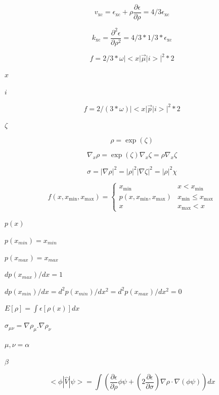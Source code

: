 \documentclass{article}
\begin{document}
\[
   v_\mathrm{xc} = \epsilon_\mathrm{xc} + \rho\frac{\partial \epsilon}{\partial \rho}
                 = 4/3\epsilon_\mathrm{xc}
\]
\pagebreak

\[
   k_\mathrm{xc} = \frac{\partial^2\epsilon}{\partial \rho^2} = 4/3*1/3 * \epsilon_\mathrm{xc}
\]
\pagebreak

\[
f = 2/3 * \omega |<x | \vec \mu | i >| ^2 * 2
\]
\pagebreak

$ x $
\pagebreak

$ i $
\pagebreak

\[
f = 2/(3 * \omega) |<x | \vec p | i >| ^2 * 2
\]
\pagebreak

$ \zeta $
\pagebreak

\[
\rho = \exp(\zeta)
\]
\pagebreak

\[
\nabla_x\rho = \exp(\zeta)\nabla_x\zeta = \rho \nabla_x\zeta
\]
\pagebreak

\[
  \sigma = |\nabla\rho|^2 = |\rho|^2 |\nabla\zeta|^2 = |\rho|^2 \chi
\]
\pagebreak

\[
f(x,x_{\mathrm{min}},x_{\mathrm{max}}) = \left\{
  \begin{array}{ll}
    x_{\mathrm{min}}                       & x < x_{\mathrm{min}} \\
    p(x,x_{\mathrm{min}},x_{\mathrm{max}}) & x_{\mathrm{min}} \leq x_{\mathrm{max}} \\
    x                                      & x_{\mathrm{max}} < x
  \end{array}
\right.
\]
\pagebreak

$p(x)$
\pagebreak

$p(x_{min})=x_{min}$
\pagebreak

$p(x_{max})=x_{max}$
\pagebreak

$dp(x_{max})/dx=1$
\pagebreak

$dp(x_{min})/dx=d^2p(x_{min})/dx^2=d^2p(x_{max})/dx^2=0$
\pagebreak

$ E[\rho] = \int \epsilon[\rho(x)] dx$
\pagebreak

$ \sigma_{\mu \nu} = \nabla \rho_{\mu} . \nabla \rho_{\nu} $
\pagebreak

$ \mu, \nu = \alpha$
\pagebreak

$ \beta $
\pagebreak

\[
  < \phi | \hat V | \psi > = \int \left( \frac{\partial \epsilon}{\partial \rho} \phi \psi
                 +  \left( 2 \frac{\partial \epsilon}{\partial \sigma} \right)
                 \nabla \rho \cdot \nabla \left( \phi \psi \right) \right) dx
\]
\pagebreak
\end{document}
